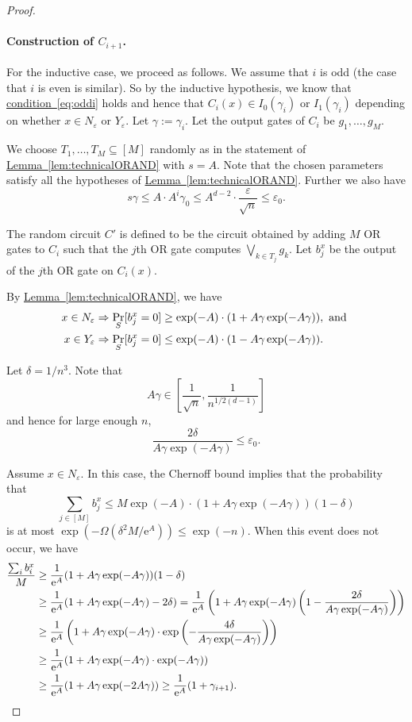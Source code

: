 \documentclass[11pt]{article}
\numberwithin{equation}{section}
\theoremstyle{definition}
\theoremstyle{plain}
\newcommand{\eee}{\mathrm e}
\newcommand{\expref}[2]{\hyperref[#2]{#1~\ref{#2}}}
\newcommand{\expeqref}[2]{\hyperref[#2]{#1~\eqref{#2}}}
\newcommand{\prob}[2]{\mathop{\mathrm{Pr}}_{#1}[#2]}
\begin{document}
\begin{proof}
\paragraph{Construction of $C_{i+1}$.} For the inductive case, we proceed as follows. We assume that $i$ is odd (the case that $i$ is even is similar). So by the inductive hypothesis, we know that \expeqref{condition}{eq:oddi} holds and hence that $C_{i}(x) \in I_0(\gamma_i)$ or $I_1(\gamma_i)$ depending on whether $x\in N_\varepsilon$ or $Y_\varepsilon$. Let $\gamma := \gamma_i$. Let the output gates of $C_i$ be $g_1,\ldots,g_M$.

We choose $T_1,\ldots,T_M\subseteq [M]$ randomly as in the statement of \expref{Lemma}{lem:technicalORAND} with $s = A$. Note that the chosen parameters satisfy all the hypotheses of \expref{Lemma}{lem:technicalORAND}. Further we also have
\[
  s\gamma \leq A\cdot A^i\gamma_0 \leq A^{d-2}\cdot \frac{\varepsilon}{\sqrt{n}}\leq \varepsilon_0.
\]

The random circuit $C'$ is defined to be the circuit obtained by adding $M$ OR gates to $C_i$ such that the $j$th OR gate computes $\bigvee_{k\in T_j}g_k$. Let $b_j^x$ be the output of the $j$th OR gate on $C_i(x)$. 

By \expref{Lemma}{lem:technicalORAND}, we have
\begin{align}
x\in N_\varepsilon &\Rightarrow \prob{S}{b_j^x = 0} \geq \exp(-A)\cdot (1+A\gamma\exp(-A\gamma)), \text{ and }\notag \\
x\in Y_\varepsilon &\Rightarrow \prob{S}{b_j^x = 0} \leq \exp(-A)\cdot(1-A\gamma\exp(-A\gamma)).\label{eq:Ci.1}
\end{align}

Let $\delta = {1}/{n^3}$. Note that
\[
  A\gamma \in \left[\frac{1}{\sqrt{n}},\frac{1}{n^{1/2(d-1)}}\right]
\]
and hence for large enough $n$,
\[
  \frac{2\delta}{A\gamma\exp(-A\gamma)}\leq \varepsilon_0.
\]

Assume $x\in N_\varepsilon$. In this case, the Chernoff bound implies that the probability that
\[
  \sum_{j\in [M]}b_j^x\leq M\exp(-A)\cdot (1+A\gamma\exp(-A\gamma))(1-\delta)
\]
is at most $\exp(-\Omega(\delta^2M/\eee^A))\leq \exp(-n)$. When this
event does not occur, we have
\begin{align}
\frac{\sum_i b_i^x}{M}&\geq \frac{1}{\eee^A}(1+A\gamma\exp(-A\gamma))(1-\delta)\notag\\
&\geq \frac{1}{\eee^A}(1+A\gamma\exp(-A\gamma) -2\delta) = \frac{1}{\eee^A}\left(1+A\gamma\exp(-A\gamma)\left(1-\frac{2\delta}{A\gamma\exp(-A\gamma)}\right)\right)\notag\\
&\geq \frac{1}{\eee^A}\left(1+A\gamma\exp(-A\gamma)\cdot \exp\left(-\frac{4\delta}{A\gamma\exp(-A\gamma)}\right)\right)\notag\\
&\geq \frac{1}{\eee^A}(1+A\gamma\exp(-A\gamma)\cdot \exp(-A\gamma))\notag\\
&\geq \frac{1}{\eee^A}(1+A\gamma\exp(-2A\gamma))\geq \frac{1}{\eee^A}(1+\gamma_{i+1}).\label{eq:Ci.2}
\end{align}


\end{proof}
\end{document}
